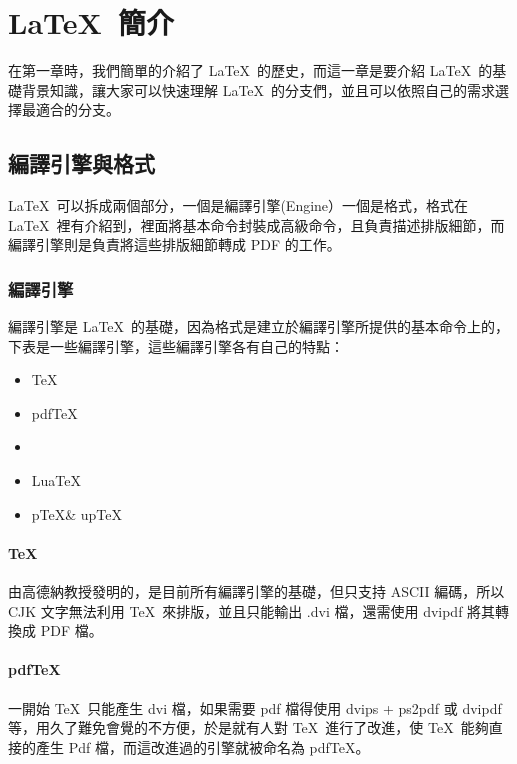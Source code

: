 \chapter{\LaTeX\ 簡介}

在第一章時，我們簡單的介紹了 \LaTeX\ 的歷史，而這一章是要介紹 \LaTeX\ 的基礎背景知識，讓大家可以快速理解 \LaTeX\ 的分支們，並且可以依照自己的需求選擇最適合的分支。

\section{編譯引擎與格式}

\LaTeX\ 可以拆成兩個部分，一個是編譯引擎(Engine）一個是格式，格式在 \LaTeX\ 裡有介紹到，裡面將基本命令封裝成高級命令，且負責描述排版細節，而編譯引擎則是負責將這些排版細節轉成 PDF 的工作。

\subsection{編譯引擎}

編譯引擎是 \LaTeX\ 的基礎，因為格式是建立於編譯引擎所提供的基本命令上的，下表是一些編譯引擎，這些編譯引擎各有自己的特點：

\begin{itemize}
\item \TeX
\item pdf\TeX
\item \XeTeX
\item Lua\TeX
\item p\TeX \& up\TeX
\end{itemize}

\subsubsection{\TeX}

由高德納教授發明的，是目前所有編譯引擎的基礎，但只支持 ASCII 編碼，所以 CJK 文字無法利用 \TeX\ 來排版，並且只能輸出 .dvi 檔，還需使用 dvipdf 將其轉換成 PDF 檔。

\subsubsection{pdf\TeX}

一開始 \TeX\ 只能產生 dvi 檔，如果需要 pdf 檔得使用 dvips + ps2pdf 或 dvipdf 等，用久了難免會覺的不方便，於是就有人對 \TeX\ 進行了改進，使 \TeX\ 能夠直接的產生 Pdf 檔，而這改進過的引擎就被命名為 pdf\TeX 。

\subsubsection{\XeTeX} 


